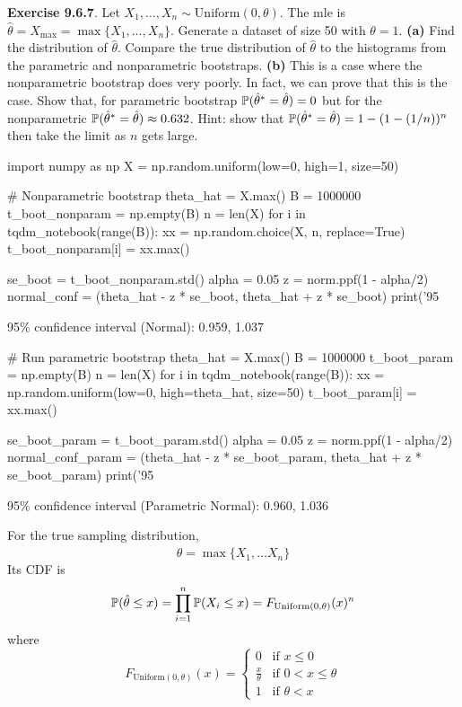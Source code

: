 \textbf{Exercise 9.6.7}. Let
\(X_{1}, \dots, X_{n} \sim \text{Uniform}(0, \theta)\). The mle is
\(\hat{\theta} = X_\text{max} = \max \{ X_{1}, \dots, X_{n} \}\). Generate a
dataset of size 50 with \(\theta = 1\).
\textbf{(a)} Find the distribution of \(\hat{\theta}\). Compare the true
distribution of \(\hat{\theta}\) to the histograms from the parametric
and nonparametric bootstraps.
\textbf{(b)} This is a case where the nonparametric bootstrap does very
poorly. In fact, we can prove that this is the case. Show that, for
parametric bootstrap \(\operatorname{\mathbb{P}}(\hat{\theta}^{*} = \hat{\theta}) = 0\)
but for the nonparametric
\(\operatorname{\mathbb{P}}(\hat{\theta}^{*} = \hat{\theta}) \approx 0.632\).
Hint: show that
\(\operatorname{\mathbb{P}}(\hat{\theta}^{*} = \hat{\theta}) = 1 - (1 - (1/n))^{n}\) then
take the limit as \(n\) gets large.

\begin{python}
import numpy as np
X = np.random.uniform(low=0, high=1, size=50)
\end{python}

\begin{python}
# Nonparametric bootstrap
theta_hat = X.max()
B = 1000000
t_boot_nonparam = np.empty(B)
n = len(X)
for i in tqdm_notebook(range(B)):
    xx = np.random.choice(X, n, replace=True)
    t_boot_nonparam[i] = xx.max()
    
se_boot = t_boot_nonparam.std()
alpha = 0.05
z = norm.ppf(1 - alpha/2)
normal_conf = (theta_hat - z * se_boot, theta_hat + z * se_boot)
print('95%
\end{python}
\begin{console}
95\% confidence interval (Normal):        0.959, 1.037
\end{console}

\begin{python}
# Run parametric bootstrap
theta_hat = X.max()
B = 1000000
t_boot_param = np.empty(B)
n = len(X)
for i in tqdm_notebook(range(B)):
    xx = np.random.uniform(low=0, high=theta_hat, size=50)
    t_boot_param[i] = xx.max()
    
se_boot_param = t_boot_param.std()
alpha = 0.05
z = norm.ppf(1 - alpha/2)
normal_conf_param = (theta_hat - z * se_boot_param, theta_hat + z * se_boot_param)
print('95%
\end{python}
\begin{console}
95\% confidence interval (Parametric Normal):     0.960, 1.036
\end{console}
For the true sampling distribution,
\[
\hat{\theta} = \max \{ X_{1}, \dots X_{n} \}
\]
Its CDF is
\[
\operatorname{\mathbb{P}}(\hat{\theta} \leq x) = \prod_{i=1}^{n} \operatorname{\mathbb{P}}(X_{i} \leq x) = F_{\text{Uniform}(0, \theta)}(x)^{n}
\]
where
\[
F_{\text{Uniform}(0, \theta)}(x) = \begin{cases}
0 & \text{if } x \leq 0 \\
\frac{x}{\theta} & \text{if } 0 < x \leq \theta \\
1 & \text{if } \theta < x
\end{cases}
\]

